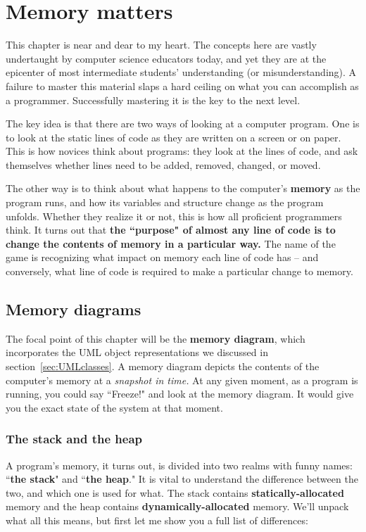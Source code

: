 
\chapter{Memory matters}
\label{ch:memoryMatters}

This chapter is near and dear to my heart. The concepts here are vastly
undertaught by computer science educators today, and yet they are at the
epicenter of most intermediate students' understanding (or misunderstanding).
A failure to master this material slaps a hard ceiling on what you can
accomplish as a programmer. Successfully mastering it is the key to the next
level.

The key idea is that there are two ways of looking at a computer program. One
is to look at the static lines of code as they are written on a screen or on
paper. This is how novices think about programs: they look at the lines of
code, and ask themselves whether lines need to be added, removed, changed, or
moved.

The other way is to think about what happens to the computer's \textbf{memory}
as the program runs, and how its variables and structure change as the program
unfolds. Whether they realize it or not, this is how all proficient
programmers think. It turns out that \textbf{the ``purpose" of almost any line
of code is to change the contents of memory in a particular way.} The name of
the game is recognizing what impact on memory each line of code has -- and
conversely, what line of code is required to make a particular change to
memory.

\section{Memory diagrams}

The focal point of this chapter will be the \textbf{memory diagram}, which
incorporates the UML object representations we discussed in
section~\ref{sec:UMLclasses}. A memory diagram depicts the contents of the
computer's memory at a \textit{snapshot in time.} At any given moment, as a
program is running, you could say ``Freeze!" and look at the memory diagram.
It would give you the exact state of the system at that moment.

\subsection{The stack and the heap}

A program's memory, it turns out, is divided into two realms with funny names:
``\textbf{the stack}" and ``\textbf{the heap}." It is vital to understand the
difference between the two, and which one is used for what. The stack contains
\textbf{statically-allocated} memory and the heap contains
\textbf{dynamically-allocated} memory. We'll unpack what all this means, but
first let me show you a full list of differences:

